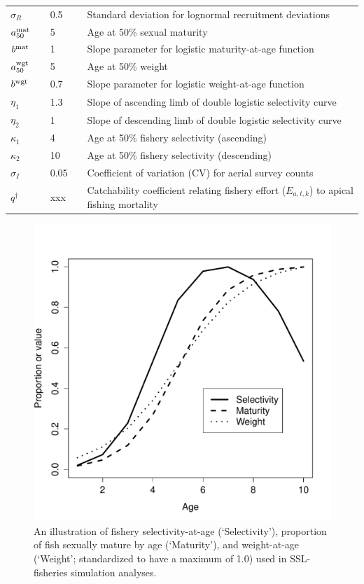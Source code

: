 \documentclass[nonumbib,leqno]{nrc1}
\begin{document}
\begin{table}
\begin{tabular}{p{3cm}lll p{9cm}}
$\sigma_R$ & & 0.5 & & Standard deviation for lognormal recruitment deviations \\
$a_{50}^{\rm mat}$ & & 5 & & Age at 50\% sexual maturity \\
$b^{\rm mat}$ & & 1 & & Slope parameter for logistic maturity-at-age function \\
$a_{50}^{\rm wgt}$ & & 5 & & Age at 50\% weight \\
$b^{\rm wgt}$ & & 0.7 & & Slope parameter for logistic weight-at-age function \\
$\eta_1$ & & 1.3 & & Slope of ascending limb of double logistic selectivity curve \\
$\eta_2$ & & 1 & & Slope of descending limb of double logistic selectivity curve \\
$\kappa_1$ & & 4 & & Age at 50\% fishery selectivity (ascending) \\
$\kappa_2$ & & 10 & & Age at 50\% fishery selectivity (descending) \\
$\sigma_I$ & & 0.05 & & Coefficient of variation (CV) for aerial survey counts \\
$ q^\dag $ & & xxx & & Catchability coefficient relating fishery effort ($E_{a,t,k}$) to apical fishing mortality \\
\bottomrule
\end{tabular}
\vspace{4in}
\end{table}

\begin{figure}
\begin{center}
\includegraphics[width= \textwidth]{At_age_plots.pdf}
\end{center}
\caption{An illustration of fishery selectivity-at-age (`Selectivity'), proportion of fish sexually
mature by age (`Maturity'), and weight-at-age (`Weight'; standardized to have a maximum of 1.0) used
in SSL-fisheries simulation analyses.}
\label{fig:at_age}
\end{figure}
\end{document}
